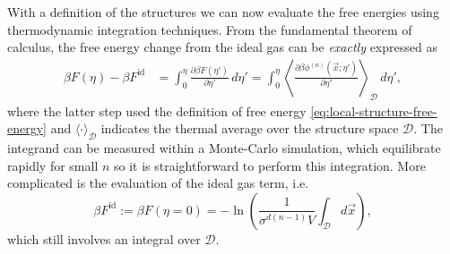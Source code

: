 \documentclass[11pt,twoside]{report}
\begin{document}
With a definition of the structures we can now evaluate the free energies using thermodynamic integration techniques.
From the fundamental theorem of calculus, the free energy change from the ideal gas can be \emph{exactly} expressed as \cite{Frenkel2002}
\begin{align}\label{eq:td-integration}
  \beta F(\eta)
  - \beta F^\mathrm{id}
  &=
  \int_0^\eta \frac{\partial \beta F(\eta')}{\partial \eta'} \, d\eta'
  =
  \int_0^\eta
  \left\langle
  \frac{\partial \beta \phi^{(n)}(\vec{x}; \eta')}{\partial \eta'}
  \right\rangle_\mathcal{D}
  \, d\eta',
\end{align}
where the latter step used the definition of free energy \eqref{eq:local-structure-free-energy} and $\langle \cdot \rangle_\mathcal{D}$ indicates the thermal average over the structure space $\mathcal{D}$.
The integrand can be measured within a Monte-Carlo simulation, which equilibrate rapidly for small $n$ so it is straightforward to perform this integration.
More complicated is the evaluation of the ideal gas term, i.e.\
\begin{equation}\label{eq:local-structure-free-energy-ideal}
  \beta F^\mathrm{id}
  :=
  \beta F(\eta=0)
  =
  -\ln{
    \left(
      \frac{1}{\sigma^{d(n-1)} V}
      \int_{\mathcal{D}} d\vec{x}
    \right)
  },
\end{equation}
which still involves an integral over $\mathcal{D}$.
\end{document}
